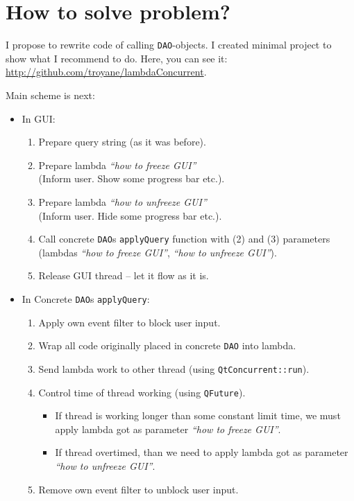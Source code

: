 \documentclass[a4paper,12pt]{scrartcl}
\begin{document}
\section{How to solve problem?}
I propose to rewrite code of calling \texttt{DAO}-objects. I created minimal project to show what I recommend to do. Here, you can see it: \url{http://github.com/troyane/lambdaConcurrent}.

Main scheme is next:
\begin{itemize}
 \item In GUI:
 \begin{enumerate}
  \item Prepare query string (as it was before).
  \item Prepare lambda \textit{``how to freeze GUI''} \\(Inform user. Show some progress bar etc.).
  \item Prepare lambda \textit{``how to unfreeze GUI''} \\(Inform user. Hide some progress bar etc.).
  \item Call concrete \texttt{DAO}s \texttt{applyQuery} function with (2) and (3) parameters (lambdas \textit{``how to freeze GUI''}, \textit{``how to unfreeze GUI''}).
  \item Release GUI thread -- let it flow as it is.
 \end{enumerate}
 \item In Concrete \texttt{DAO}s \texttt{applyQuery}:
 \begin{enumerate}
  \item Apply own event filter to block user input.
  \item Wrap all code originally placed in concrete \texttt{DAO} into lambda.
  \item Send lambda work to other thread (using \texttt{QtConcurrent::run}).
  \item Control time of thread working (using \texttt{QFuture}).
  \begin{itemize}
   \item If thread is working longer than some constant limit time, we must apply lambda got as parameter \textit{``how to freeze GUI''}.
   \item If thread overtimed, than we need to apply lambda got as parameter \textit{``how to unfreeze GUI''}.
  \end{itemize}
  \item Remove own event filter to unblock user input.
 \end{enumerate}
\end{itemize}
\end{document}
